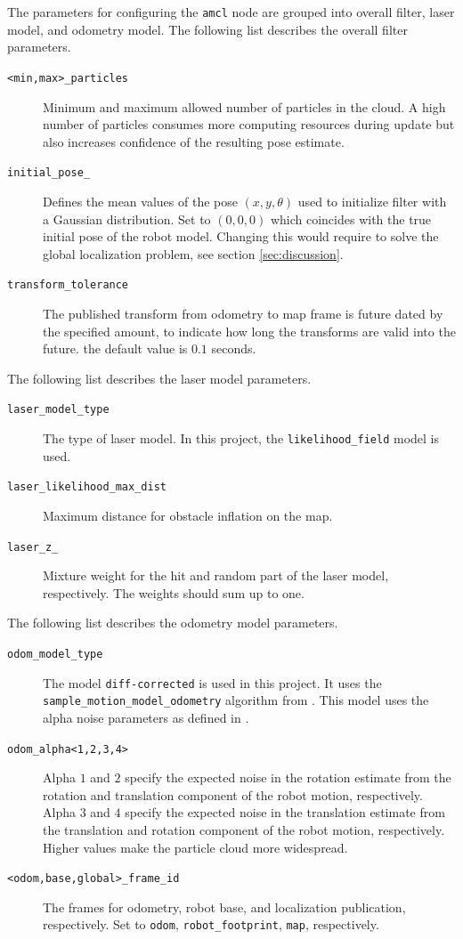 \documentclass[10pt,journal,compsoc]{IEEEtran}
\begin{document}
The parameters for configuring the \texttt{amcl} node are grouped into overall filter, laser model, and odometry model. The following list describes the overall filter parameters.
\begin{description}
\item[\texttt{<min,max>\_particles}] Minimum and maximum allowed number of particles in the cloud. A high number of particles consumes more computing resources during update but also increases confidence of the resulting pose estimate.
\item[\texttt{initial\_pose\_<x,y,a>}] Defines the mean values of the pose $( x,y,\theta )$ used to initialize filter with a Gaussian distribution. Set to $(0,0,0)$ which coincides with the true initial pose of the robot model. Changing this would require to solve the global localization problem, see section \ref{sec:discussion}.
\item[\texttt{transform\_tolerance}] The published transform from odometry to map frame is future dated by the specified amount, to indicate how long the transforms are valid into the future. the default value is $0.1$ seconds.
\end{description}

The following list describes the laser model parameters.
\begin{description}
\item[\texttt{laser\_model\_type}] The type of laser model. In this project, the \texttt{likelihood\_field} model is used.
\item[\texttt{laser\_likelihood\_max\_dist}] Maximum distance for obstacle inflation on the map.
\item[\texttt{laser\_z\_<hit,rand>}] Mixture weight for the hit and random part of the laser model, respectively. The weights should sum up to one.
\end{description}

The following list describes the odometry model parameters.
\begin{description}
\item[\texttt{odom\_model\_type}] The model \texttt{diff-corrected} is used in this project. It uses the \texttt{sample\_motion\_model\_odometry} algorithm from \cite{probabilistic_robotics}. This model uses the alpha noise parameters as defined in \cite{probabilistic_robotics}.
\item[\texttt{odom\_alpha<1,2,3,4>}] Alpha $1$ and $2$ specify the expected noise in the rotation estimate from the rotation and translation component of the robot motion, respectively. Alpha $3$ and $4$ specify the expected noise in the translation estimate from the translation and rotation component of the robot motion, respectively. Higher values make the particle cloud more widespread.
\item[\texttt{<odom,base,global>\_frame\_id}]  The frames for odometry, robot base, and localization publication, respectively. Set to \texttt{odom}, \texttt{robot\_footprint}, \texttt{map}, respectively.
\end{description}
\end{document}
